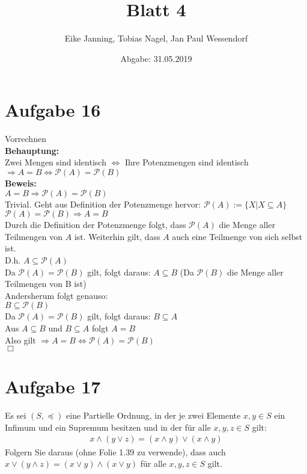 \documentclass[paper = a4, ngerman]{scrartcl}
\title{Blatt 4}
\author{Eike Janning, Tobias Nagel, Jan Paul Wessendorf}
\date{Abgabe: 31.05.2019}
\begin{document}
	\maketitle
	\hrulefill
	
	\section*{Aufgabe 16}
	Vorrechnen\\
	\textbf{Behauptung:}\\
	Zwei Mengen sind identisch $\Leftrightarrow$ Ihre Potenzmengen sind identisch\\
	
	$\Rightarrow A = B \Leftrightarrow \mathcal{P}(A) = \mathcal{P}(B) $\\
	
	\textbf{Beweis:}\\
	$ A = B \Rightarrow \mathcal{P}(A) = \mathcal{P}(B) $\\
	Trivial. Geht aus Definition der Potenzmenge hervor: $\mathcal{P}(A) := \{ X | X \subseteq A\}$\\
	
	$\mathcal{P}(A) = \mathcal{P}(B) \Rightarrow A = B$\\
	
	Durch die Definition der Potenzmenge folgt, dass $\mathcal{P}(A)$ die Menge aller Teilmengen von $A$ ist. Weiterhin gilt, dass $A$ auch eine Teilmenge von sich selbst ist.\\
	D.h. $A \subseteq \mathcal{P}(A)$\\
	Da $\mathcal{P}(A) = \mathcal{P}(B)$ gilt, folgt daraus: $A \subseteq B$  (Da $\mathcal{P}(B)$ die Menge aller Teilmengen von B ist)\\
	
	Andersherum folgt genauso:\\
	$B \subseteq \mathcal{P}(B)$\\
	Da $\mathcal{P}(A) = \mathcal{P}(B)$ gilt, folgt daraus: $B \subseteq A$\\
	
	Aus $A \subseteq B$ und $B \subseteq A$ folgt $A = B$\\
	
	Also gilt 	$\Rightarrow A = B \Leftrightarrow \mathcal{P}(A) = \mathcal{P}(B) $\\
	
	\hfil$\Box$
	\section*{Aufgabe 17}
	Es sei $(S,\preceq)$ eine Partielle Ordnung, in der je zwei Elemente $x,y\in S$ ein Infimum und ein Supremum besitzen und in der für alle $x,y,z \in S$ gilt:
	\begin{align}
		x \wedge (y \vee z) = (x \wedge y) \vee (x \wedge y)
	\end{align}
	Folgern Sie daraus (ohne Folie 1.39 zu verwende), dass auch $x \vee (y \wedge z) = (x \vee y) \wedge (x \vee y)$ für alle $x,y,z \in S$ gilt.
	
\end{document}
